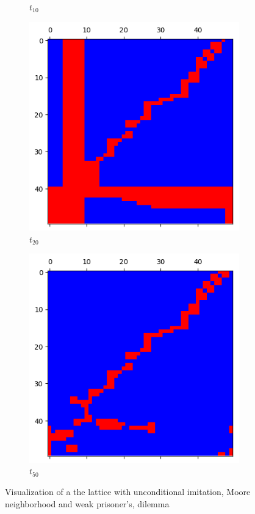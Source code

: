\documentclass[letterpaper]{article}
\begin{document}
\begin{figure}
\begin{subfigure}{.33\textwidth}
      \caption{$t_{10}$}
      \label{fig:t10_50part1}
    \end{subfigure}
    \begin{subfigure}{.33\textwidth}
      \centering
      \includegraphics[width=1\linewidth]{images/assign2/visu_50-part1/t20}
      \caption{$t_{20}$}
      \label{fig:t20_50part1}
    \end{subfigure}
    \begin{subfigure}{.33\textwidth}
      \centering
      \includegraphics[width=1\linewidth]{images/assign2/visu_50-part1/t50}
      \caption{$t_{50}$}
      \label{fig:t50_50part1}
    \end{subfigure}
    \caption{Visualization of a the lattice with unconditional imitation,
    Moore neighborhood and weak prisoner's, dilemma}
    \label{fig:visu50part1}
\end{figure}
\end{document}
